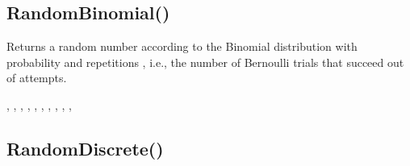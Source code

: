 \documentclass[letterpaper,10pt,english]{sphinxmanual}
\begin{document}
\subsection{RandomBinomial()}
\label{\detokenize{reference/peblmath:randombinomial}}
\sphinxAtStartPar
{}

\sphinxAtStartPar
Returns a random number according to the Binomial   distribution with probability  and repetitions ,   i.e., the number of  Bernoulli trials that succeed out of    attempts.

\sphinxAtStartPar
{}

\begin{sphinxVerbatim}[commandchars=\\\{\}]
\end{sphinxVerbatim}

\sphinxAtStartPar
{}

\begin{sphinxVerbatim}[commandchars=\\\{\}]
\end{sphinxVerbatim}

\sphinxAtStartPar
{}

\sphinxAtStartPar
{}, , ,            , , ,                , , ,                     , 


\subsection{RandomDiscrete()}
\label{\detokenize{reference/peblmath:randomdiscrete}}
\sphinxAtStartPar
{}
\end{document}
